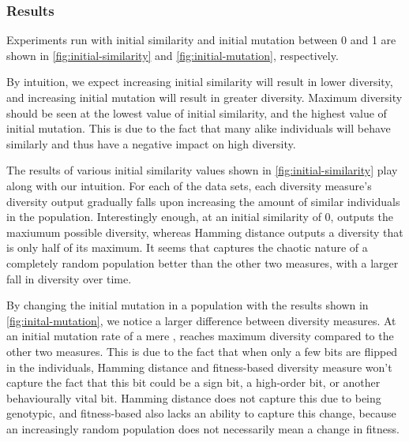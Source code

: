 \subsubsection{Results}
Experiments run with initial similarity and initial mutation between 0 and 1 are shown in \cref{fig:initial-similarity} and \cref{fig:initial-mutation}, respectively.

By intuition, we expect increasing initial similarity will result in lower diversity, and increasing initial mutation will result in greater diversity. Maximum diversity should be seen at the lowest value of initial similarity, and the highest value of initial mutation. This is due to the fact that many alike individuals will behave similarly and thus have a negative impact on high diversity.




The results of various initial similarity values shown in \cref{fig:initial-similarity} play along with our intuition. For each of the data sets, each diversity measure's diversity output gradually falls upon increasing the amount of similar individuals in the population. Interestingly enough, at an initial similarity of 0, \dia{} outputs the maxiumum possible diversity, whereas Hamming distance outputs a diversity that is only half of its maximum. It seems that \dia{} captures the chaotic nature of a completely random population better than the other two measures, with a larger fall in diversity over time.



By changing the initial mutation in a population with the results shown in \cref{fig:inital-mutation}, we notice a larger difference between diversity measures. At an initial mutation rate of a mere , \dia{} reaches maximum diversity compared to the other two measures. This is due to the fact that when only a few bits are flipped in the individuals, Hamming distance and fitness-based diversity measure won't capture the fact that this bit could be a sign bit, a high-order bit, or another behaviourally vital bit. Hamming distance does not capture this due to being genotypic, and fitness-based also lacks an ability to capture this change, because an increasingly random population does not necessarily mean a change in fitness.
